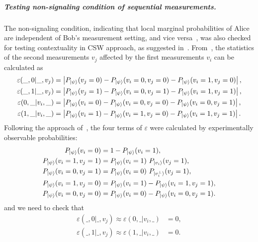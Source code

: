 \documentclass[pra,aps,notitlepage,superscriptaddress,showpacs,showkeys]{revtex4-1}
\theoremstyle{definition}
\theoremstyle{remark}
\begin{document}
 \subparagraph{Testing non-signaling condition of sequential measurements.}
 The non-signaling condition, indicating that local marginal probabilities of Alice are independent of Bob's measurement setting, and vice versa~\cite{Brunner14}, was also checked for testing contextuality in CSW approach, as suggested in~\cite{cabello16s, yxiao17s}.
 From~\cite{cabello16s}, the statistics of the second measurements $v_j$ affected by the first measurements $v_i$ can be calculated as
 \begin{subequations}
    \begin{align}
        \varepsilon(\_, 0|\_, v_j) &= \left| P_{\ket{\psi}} (v_j = 0) - P_{\ket{\psi}} (v_i = 0, v_j = 0) - P_{\ket{\psi}} (v_i = 1, v_j = 0) \right|, \\
        \varepsilon(\_, 1|\_, v_j) &= \left| P_{\ket{\psi}} (v_j = 1) - P_{\ket{\psi}} (v_i = 0, v_j = 1) - P_{\ket{\psi}} (v_i = 1, v_j = 1) \right|, \\
        \varepsilon(0, \_|v_i, \_) &= \left| P_{\ket{\psi}} (v_i = 0) - P_{\ket{\psi}} (v_i = 0, v_j = 0) - P_{\ket{\psi}} (v_i = 0, v_j = 1) \right|, \\
        \varepsilon(1, \_|v_i, \_) &= \left| P_{\ket{\psi}} (v_i = 1) - P_{\ket{\psi}} (v_i = 1, v_j = 0) - P_{\ket{\psi}} (v_i = 1, v_j = 1) \right|.
    \end{align}
 \end{subequations}
Following the approach of~\cite{yxiao17s}, the four terms of $\varepsilon$  were calculated by experimentally observable probabilities:
 \begin{subequations}
    \begin{align}
        P_{\ket{\psi}} (v_i = 0) &= 1 - P_{\ket{\psi}} (v_i = 1),  \label{eq:averta}\\
        P_{\ket{\psi}} (v_i = 1, v_j = 1) &= P_{\ket{\psi}} (v_i = 1) ~ P_{\ket{v_i}} (v_j = 1), \label{eq:avertb}\\
        P_{\ket{\psi}} (v_i = 0, v_j = 1) &= P_{\ket{\psi}} (v_i = 0) ~ P_{\ket{v_i^\perp}} (v_j = 1), \label{eq:avertc} \\
        P_{\ket{\psi}} (v_i = 1, v_j = 0) &= P_{\ket{\psi}} (v_i = 1) - P_{\ket{\psi}} (v_i = 1, v_j = 1), \label{eq:avertd} \\
        P_{\ket{\psi}} (v_i = 0, v_j = 0) &= P_{\ket{\psi}} (v_i = 0) - P_{\ket{\psi}} (v_i = 0, v_j = 1). \label{eq:averte}
    \end{align}
 \end{subequations}
 and we need to check that
 \begin{subequations}
    \begin{align}
        \varepsilon(\_, 0|\_, v_j) \approx \varepsilon(0, \_|v_i, \_) &= 0, \\
        \varepsilon(\_, 1|\_, v_j) \approx \varepsilon(1, \_|v_i, \_) &= 0.
    \end{align}
    \label{eq:epsij}
 \end{subequations}
\end{document}

